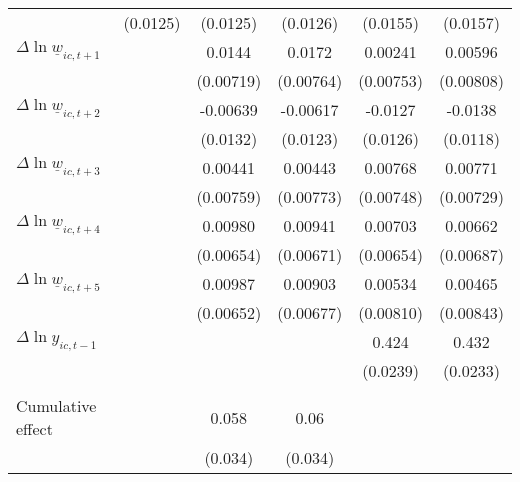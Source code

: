 {\begin{tabular}{l*{5}{c}}
          & (0.0125)         & (0.0125)         & (0.0126)         & (0.0155)         & (0.0157)         \\
[1em]
$\Delta \ln \underline{w}_{ic,t+1}$&                  &   0.0144\sym{*}  &   0.0172\sym{**} &  0.00241         &  0.00596         \\
          &                  &(0.00719)         &(0.00764)         &(0.00753)         &(0.00808)         \\
[1em]
$\Delta \ln \underline{w}_{ic,t+2}$&                  & -0.00639         & -0.00617         &  -0.0127         &  -0.0138         \\
          &                  & (0.0132)         & (0.0123)         & (0.0126)         & (0.0118)         \\
[1em]
$\Delta \ln \underline{w}_{ic,t+3}$&                  &  0.00441         &  0.00443         &  0.00768         &  0.00771         \\
          &                  &(0.00759)         &(0.00773)         &(0.00748)         &(0.00729)         \\
[1em]
$\Delta \ln \underline{w}_{ic,t+4}$&                  &  0.00980         &  0.00941         &  0.00703         &  0.00662         \\
          &                  &(0.00654)         &(0.00671)         &(0.00654)         &(0.00687)         \\
[1em]
$\Delta \ln \underline{w}_{ic,t+5}$&                  &  0.00987         &  0.00903         &  0.00534         &  0.00465         \\
          &                  &(0.00652)         &(0.00677)         &(0.00810)         &(0.00843)         \\
[1em]
$\Delta \ln y_{ic,t-1}$&                  &                  &                  &    0.424\sym{***}&    0.432\sym{***}\\
          &                  &                  &                  & (0.0239)         & (0.0233)         \\
\hline
\vspace{-2mm}&                  &                  &                  &                  &                  \\
Cumulative effect&                  &0.058\sym{*}         &0.06\sym{*}         &                  &                  \\
          &                  &  (0.034)         &  (0.034)         &                  &                  \\

\end{tabular}}
